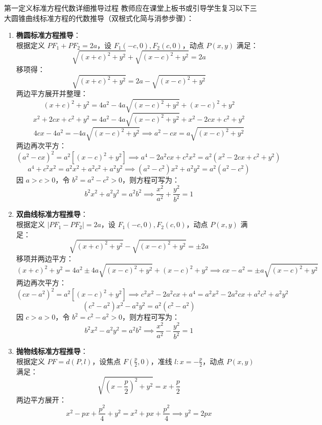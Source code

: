 \documentclass[11pt,a4paper]{ctexart}
\begin{document}
\begin{teachbox}{第一定义标准方程代数详细推导过程}
教师应在课堂上板书或引导学生复习以下三大圆锥曲线标准方程的代数推导（双根式化简与消参步骤）：
\begin{enumerate}
  \item \textbf{椭圆标准方程推导}：\\
        根据定义 $PF_1 + PF_2 = 2a$，设 $F_1(-c,0), F_2(c,0)$，动点 $P(x,y)$ 满足：
        \[ \sqrt{(x+c)^2+y^2} + \sqrt{(x-c)^2+y^2} = 2a \]
        移项得：
        \[ \sqrt{(x+c)^2+y^2} = 2a - \sqrt{(x-c)^2+y^2} \]
        两边平方展开并整理：
        \[ (x+c)^2+y^2 = 4a^2 - 4a\sqrt{(x-c)^2+y^2} + (x-c)^2+y^2 \]
        \[ x^2+2cx+c^2+y^2 = 4a^2 - 4a\sqrt{(x-c)^2+y^2} + x^2-2cx+c^2+y^2 \]
        \[ 4cx - 4a^2 = -4a\sqrt{(x-c)^2+y^2} \implies a^2 - cx = a\sqrt{(x-c)^2+y^2} \]
        两边再次平方：
        \[ (a^2 - cx)^2 = a^2 \left[ (x-c)^2+y^2 \right] \implies a^4 - 2a^2 cx + c^2 x^2 = a^2 (x^2 - 2cx + c^2 + y^2) \]
        \[ a^4 + c^2 x^2 = a^2 x^2 + a^2 c^2 + a^2 y^2 \implies (a^2 - c^2)x^2 + a^2 y^2 = a^2 (a^2 - c^2) \]
        因 $a > c > 0$，令 $b^2 = a^2 - c^2 > 0$，则方程可写为：
        \[ b^2 x^2 + a^2 y^2 = a^2 b^2 \implies \frac{x^2}{a^2} + \frac{y^2}{b^2} = 1 \]
  \item \textbf{双曲线标准方程推导}：\\
        根据定义 $|PF_1 - PF_2| = 2a$，设 $F_1(-c,0), F_2(c,0)$，动点 $P(x,y)$ 满足：
        \[ \sqrt{(x+c)^2+y^2} - \sqrt{(x-c)^2+y^2} = \pm 2a \]
        移项并两边平方：
        \[ (x+c)^2+y^2 = 4a^2 \pm 4a\sqrt{(x-c)^2+y^2} + (x-c)^2+y^2 \implies cx - a^2 = \pm a\sqrt{(x-c)^2+y^2} \]
        两边再次平方：
        \[ (cx - a^2)^2 = a^2 \left[ (x-c)^2+y^2 \right] \implies c^2 x^2 - 2a^2 cx + a^4 = a^2 x^2 - 2a^2 cx + a^2 c^2 + a^2 y^2 \]
        \[ (c^2 - a^2)x^2 - a^2 y^2 = a^2 (c^2 - a^2) \]
        因 $c > a > 0$，令 $b^2 = c^2 - a^2 > 0$，则方程可写为：
        \[ b^2 x^2 - a^2 y^2 = a^2 b^2 \implies \frac{x^2}{a^2} - \frac{y^2}{b^2} = 1 \]
  \item \textbf{抛物线标准方程推导}：\\
        根据定义 $PF = d(P,l)$，设焦点 $F(\frac{p}{2},0)$，准线 $l: x = -\frac{p}{2}$，动点 $P(x,y)$ 满足：
        \[ \sqrt{\left(x-\frac{p}{2}\right)^2+y^2} = x + \frac{p}{2} \]
        两边平方展开：
        \[ x^2 - px + \frac{p^2}{4} + y^2 = x^2 + px + \frac{p^2}{4} \implies y^2 = 2px \]
\end{enumerate}
\end{teachbox}
\end{document}
